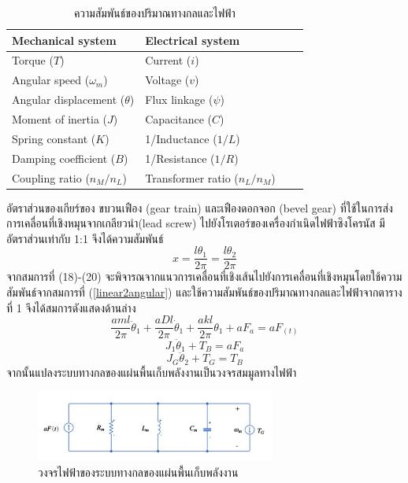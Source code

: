 \documentclass[11pt,a4paper]{article}
\begin{document}
\begin{table}
    \centering
    \begin{tabular}{ | l | l | l | p{5cm} |}
        \hline
        \textbf{Mechanical system}      & \textbf{Electrical system}        \\ \hline
        Torque ($T$)                    & Current ($i$)                     \\ \hline
        Angular speed ($\omega_{m}$)    & Voltage ($v$)                     \\ \hline
        Angular displacement ($\theta$) & Flux linkage ($\psi$)             \\ \hline
        Moment of inertia ($J$)         & Capacitance ($C$)                 \\ \hline
        Spring constant ($K$)           & 1/Inductance ($1/L$)              \\ \hline
        Damping coefficient ($B$)       & 1/Resistance ($1/R$)              \\ \hline
        Coupling ratio ($n_{M}/n_{L}$)  & Transformer ratio ($n_{L}/n_{M}$) \\
        \hline
    \end{tabular}
    \caption{ความสัมพันธ์ของปริมาณทางกลและไฟฟ้า\cite{ElecDrive}}
\end{table}

อัตราส่วนของเกียร์ของ ขบวนเฟือง (gear train) และเฟืองดอกจอก (bevel gear) ที่ใช้ในการส่งการเคลื่อนที่เชิงหมุนจากเกลียวนำ(lead screw) ไปยังโรเตอร์ของเครื่องกำเนิดไฟฟ้าซิงโครนัส มีอัตราส่วนเท่ากับ 1:1 จึงได้ความสัมพันธ์
\begin{equation}\label{linear2angular}
    x = \frac{l\theta_{1}}{2\pi} = \frac{l\theta_{2}}{2\pi}
\end{equation}
จากสมการที่ (18)-(20) จะพิจารณจากแนวการเคลื่อนที่เชิงเส้นไปยังการเคลื่อนที่เชิงหมุนโดยใช้ความสัมพันธ์จากสมการที่ (\ref{linear2angular}) และใช้ความสัมพันธ์ของปริมาณทางกลและไฟฟ้าจากตารางที่ 1 จึงได้สมการดังแสดงด้านล่าง
\begin{equation}
    \frac{aml}{2\pi}\ddot{\theta}_{1} + \frac{aDl}{2\pi}\dot{\theta}_{1} + \frac{akl}{2\pi}\theta_{1} + aF_{a} = aF_(t)
\end{equation}
\begin{equation}
    J_{1}\ddot{\theta}_{1} + T_{B} = aF_{a}
\end{equation}
\begin{equation}
    J_{G}\ddot{\theta}_{2} + T_{G} = T_{B}
\end{equation}
จากนั้นแปลงระบบทางกลของแผ่นพื้นเก็บพลังงานเป็นวงจรสมมูลทางไฟฟ้า
\begin{figure}[h!]
    \begin{center}
        \includegraphics[width=0.7\textwidth]{mech_circuit.jpg}
    \end{center}
    \caption{วงจรไฟฟ้าของระบบทางกลของแผ่นพื้นเก็บพลังงาน}
    \label{mech_circuit}
\end{figure}
\end{document}
